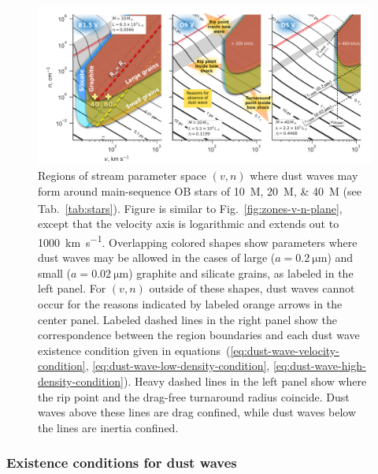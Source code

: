 \begin{figure}
  \centering
  \includegraphics[width=\linewidth]{figs/existence-dust-wave}
  \caption{Regions of stream parameter space \((v, n)\) where dust
    waves may form around main-sequence OB stars of
    \SIlist{10;20;40}{M_\odot} (see Tab.~\ref{tab:stars}).  Figure is
    similar to Fig.~\ref{fig:zones-v-n-plane}, except that the
    velocity axis is logarithmic and extends out to
    \SI{1000}{km.s^{-1}}.  Overlapping colored shapes show parameters
    where dust waves may be allowed in the cases of large
    (\(a = \SI{0.2}{\um}\)) and small (\(a = \SI{0.02}{\um}\))
    graphite and silicate grains, as labeled in the left panel.  For
    \((v, n)\) outside of these shapes, dust waves cannot occur for
    the reasons indicated by labeled orange arrows in the center
    panel.  Labeled dashed lines in the right panel show the
    correspondence between the region boundaries and each dust wave
    existence condition given in
    equations~(\ref{eq:dust-wave-velocity-condition},
    \ref{eq:dust-wave-low-density-condition},
    \ref{eq:dust-wave-high-density-condition}). Heavy dashed lines in
    the left panel show where the rip point and the drag-free
    turnaround radius coincide.  Dust waves above these lines are drag
    confined, while dust waves below the lines are inertia confined.
  }
  \label{fig:existence-dust-wave}
\end{figure}

\subsubsection{Existence conditions for dust waves}
\label{sec:exist-cond-separ}

